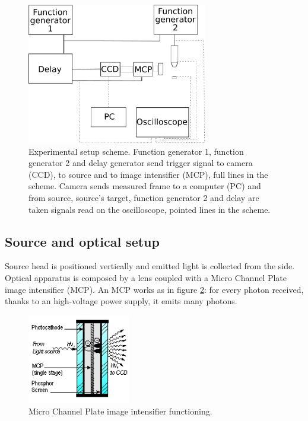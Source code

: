 \begin{figure}
 \centering
 \includegraphics[width=0.7\textwidth]{Images/Shape/acq_ottica.png}
 \caption{Experimental setup scheme. Function generator 1, function generator 2 and delay generator send trigger signal to camera (CCD), to source and to image intensifier (MCP), full lines in the scheme. Camera sends measured frame to a computer (PC) and from source, source's target, function generator 2 and delay are taken signals read on the oscilloscope, pointed lines in the scheme.}
 \label{fig:schemashape}
\end{figure}



\subsection{Source and optical setup}
Source head is positioned vertically and emitted light is collected from the side.
Optical apparatus is composed by a lens %
 coupled with a Micro Channel Plate image intensifier (MCP). An MCP works as in figure \ref{fig:MCP}: for every photon received, thanks to an high-voltage power supply, it emits many photons.
\begin{figure}
 \centering
 \includegraphics[width=0.4\textwidth]{Images/Shape/MCPsingle-stage.jpg}
 \caption{Micro Channel Plate image intensifier functioning.}
 \label{fig:MCP}
\end{figure}

